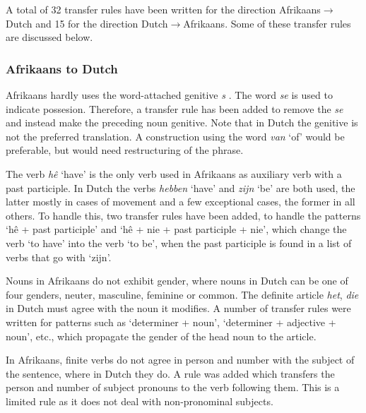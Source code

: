 \documentclass[11pt]{article}
\begin{document}
A total of 32 transfer rules have been written for the direction Afrikaans$\rightarrow$Dutch and
15 for the direction Dutch$\rightarrow$Afrikaans. Some of these transfer rules are discussed 
below.

\subsubsection{Afrikaans to Dutch}


Afrikaans hardly uses the word-attached genitive \emph{s} \cite{Donaldson:93}. The word \emph{se} is used to indicate possesion. 
Therefore, a transfer rule has been added to remove the \emph{se} and instead make the preceding
noun genitive. Note that in Dutch the genitive is not the preferred translation. A construction using
the word \emph{van} `of' would be preferable, but would need restructuring of the phrase. 


The verb \emph{hê} `have' is the only verb used in Afrikaans as auxiliary
verb with a past participle. In Dutch the verbs \emph{hebben} `have' and \emph{zijn} `be' 
are both used, the latter mostly in cases of movement and a few exceptional cases, the
former in all others. To handle this, two transfer rules have been added, to handle the
patterns `hê + past participle' and `hê + nie + past participle + nie', which change the
verb `to have' into the verb `to be', when the past participle is found in a list of verbs that go with
`zijn'.



Nouns in Afrikaans do not exhibit gender, where nouns in Dutch can be one of four genders,
neuter, masculine, feminine or common. The definite article \emph{het}, \emph{die} in Dutch must agree with 
the noun it modifies. A number of transfer rules were written for patterns such as `determiner + noun',
`determiner + adjective + noun', etc., which propagate the gender of the head noun to the article.

In Afrikaans, finite verbs do not agree in person and number with the subject of the sentence, where in 
Dutch they do. A rule was added which transfers the person and number of subject pronouns to the verb
following them. This is a limited rule as it does not deal with non-pronominal subjects.
\end{document}
